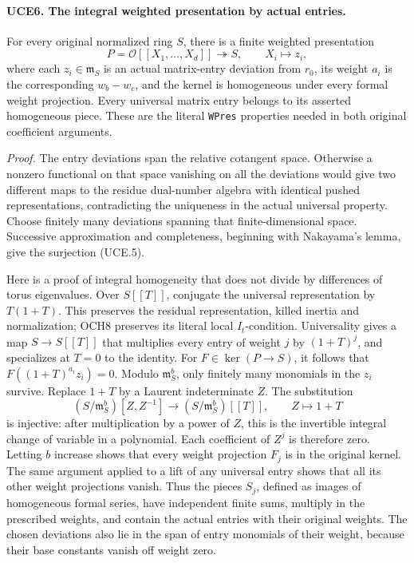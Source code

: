 \documentclass[11pt,a4paper]{article}
\numberwithin{equation}{section}
\theoremstyle{remark}\newtheorem{remark}[theorem]{Remark}
\begin{document}
\paragraph{UCE6. The integral weighted presentation by actual entries.}
\label{claim:UCE6}
For every original normalized ring \(S\), there is a finite
weighted presentation
\[
 P=\mathcal O[[X_1,\ldots,X_d]]\twoheadrightarrow S,
 \qquad X_i\longmapsto z_i,
 \tag{UCE.5}
\]
where each \(z_i\in\mathfrak m_S\) is an actual matrix-entry
deviation from \(r_0\), its weight \(a_i\) is the corresponding
\(w_b-w_c\), and the kernel is homogeneous under every formal
weight projection.  Every universal matrix entry belongs to its
asserted homogeneous piece.  These are the literal \texttt{WPres}
properties needed in both original coefficient arguments.

\emph{Proof.}
The entry deviations span the relative cotangent space.  Otherwise
a nonzero functional on that space vanishing on all the deviations
would give two different maps to the residue dual-number algebra
with identical pushed representations, contradicting the uniqueness
in the actual universal property.  Choose finitely many deviations
spanning that finite-dimensional space.  Successive approximation
and completeness, beginning with Nakayama's lemma, give the
surjection (UCE.5).

Here is a proof of integral homogeneity that does not divide by
differences of torus eigenvalues.  Over \(S[[T]]\), conjugate the
universal representation by \(T(1+T)\).  This preserves the
residual representation, killed inertia and normalization; OCH8
preserves its literal local \(I_t\)-condition.  Universality gives
a map \(S\to S[[T]]\) that multiplies every entry of weight \(j\)
by \((1+T)^j\), and specializes at \(T=0\) to the identity.
For \(F\in\ker(P\to S)\), it follows that
\(F((1+T)^{a_i}z_i)=0\).
Modulo \(\mathfrak m_S^b\), only finitely many monomials in the
\(z_i\) survive.  Replace \(1+T\) by a Laurent indeterminate
\(Z\).  The substitution
\[
 (S/\mathfrak m_S^b)[Z,Z^{-1}]
       \longrightarrow(S/\mathfrak m_S^b)[[T]],\qquad Z\mapsto1+T
\]
is injective: after multiplication by a power of \(Z\), this is
the invertible integral change of variable in a polynomial.
Each coefficient of \(Z^j\) is therefore zero.  Letting \(b\)
increase shows that every weight projection \(F_j\) is in the
original kernel.  The same argument applied to a lift of any
universal entry shows that all its other weight projections vanish.
Thus the pieces \(S_j\), defined as images of homogeneous formal
series, have independent finite sums, multiply in the prescribed
weights, and contain the actual entries with their original weights.
The chosen deviations also lie in the span of entry monomials of
their weight, because their base constants vanish off weight zero.
\end{document}
